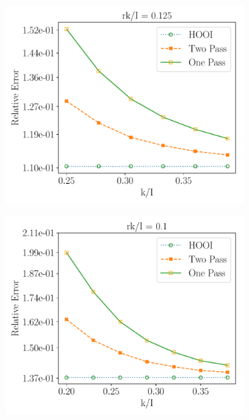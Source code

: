 \begin{figure}
    \centering
    \begin{subfigure}{0.32\textwidth}
    \includegraphics[scale = 0.3]{figure/BURDENDUST_frk8.pdf}
    \end{subfigure}
    \begin{subfigure}{0.32\textwidth}
    \includegraphics[scale = 0.3]{figure/BURDENDUST_frk10.pdf}
    \end{subfigure}
    \begin{subfigure}{0.32\textwidth}

\end{subfigure}
\end{figure}
